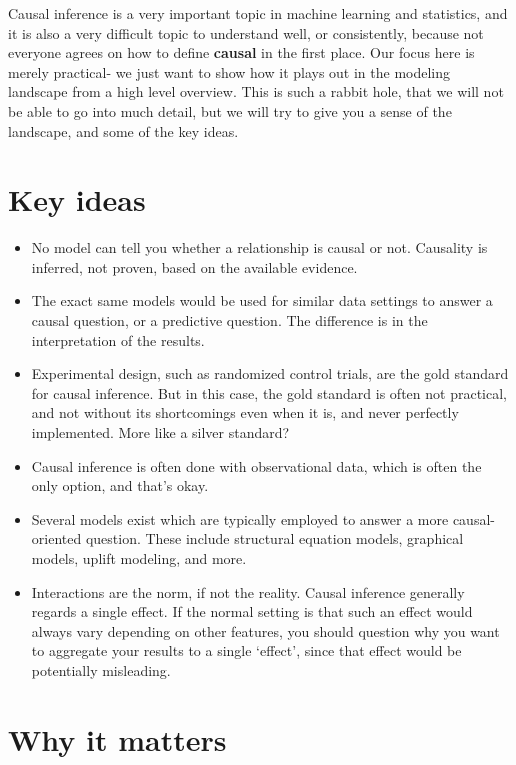 \documentclass[
  letterpaper,
]{krantz}
\providecommand{\tightlist}{%
  \setlength{\itemsep}{0pt}\setlength{\parskip}{0pt}}\usepackage{longtable,booktabs,array}
\begin{document}
Causal inference is a very important topic in machine learning and
statistics, and it is also a very difficult topic to understand well, or
consistently, because not everyone agrees on how to define
\textbf{causal} in the first place. Our focus here is merely practical-
we just want to show how it plays out in the modeling landscape from a
high level overview. This is such a rabbit hole, that we will not be
able to go into much detail, but we will try to give you a sense of the
landscape, and some of the key ideas.

\section{Key ideas}\label{key-ideas-4}

\begin{itemize}
\tightlist
\item
  No model can tell you whether a relationship is causal or not.
  Causality is inferred, not proven, based on the available evidence.
\item
  The exact same models would be used for similar data settings to
  answer a causal question, or a predictive question. The difference is
  in the interpretation of the results.
\item
  Experimental design, such as randomized control trials, are the gold
  standard for causal inference. But in this case, the gold standard is
  often not practical, and not without its shortcomings even when it is,
  and never perfectly implemented. More like a silver standard?
\item
  Causal inference is often done with observational data, which is often
  the only option, and that's okay.
\item
  Several models exist which are typically employed to answer a more
  causal-oriented question. These include structural equation models,
  graphical models, uplift modeling, and more.
\item
  Interactions are the norm, if not the reality. Causal inference
  generally regards a single effect. If the normal setting is that such
  an effect would always vary depending on other features, you should
  question why you want to aggregate your results to a single `effect',
  since that effect would be potentially misleading.
\end{itemize}

\section{Why it matters}\label{why-it-matters}
\end{document}
